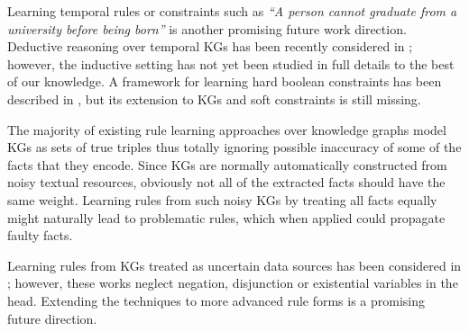 Learning temporal rules or constraints such as \emph{``A person cannot graduate from a university before being born''} is another promising future work direction. Deductive reasoning over temporal KGs has been recently considered in \cite{DBLP:conf/aaai/ChekolPSS17}; however, the inductive setting has not yet been studied in full details to the best of our knowledge. A framework for learning hard boolean constraints has been described in \cite{DBLP:conf/aaai/RaedtPT18}, but its extension to KGs and soft constraints is still missing. 

The majority of existing rule learning approaches over knowledge graphs model KGs as sets of true triples thus totally ignoring possible inaccuracy of some of the facts that they encode. Since KGs are normally automatically constructed from noisy textual resources, obviously not all of the extracted facts should have the same weight. Learning rules from such noisy KGs by treating all facts equally might naturally lead to problematic rules, which when applied could propagate faulty facts. 

Learning rules from KGs treated as uncertain data sources has  been considered in \cite{probfoil,DBLP:conf/ijcai/RaedtDTBV15,DBLP:conf/clima/CorapiSIR11}; however, these works neglect negation, disjunction or existential variables in the head. %
Extending the techniques to more advanced rule forms is a promising future direction. %


